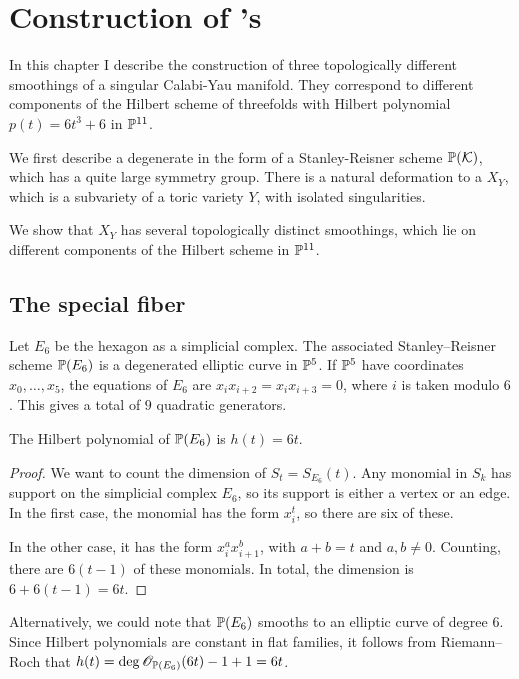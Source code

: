 \chapter{Construction of \CY's}
\label{sec:constructions}

In this chapter I describe the construction of three topologically different smoothings of a singular Calabi-Yau manifold. They correspond to different components of the Hilbert scheme of threefolds with Hilbert polynomial $p(t)=6t^3+6$ in $\P^{11}$. 

We first describe a degenerate \CY in the form of a Stanley-Reisner scheme $\P(\K)$, which has a quite large symmetry group. There is a natural deformation to a $X_Y$, which is a subvariety of a toric variety $Y$, with isolated singularities.

We show that $X_Y$ has several topologically distinct smoothings, which lie on different components of the Hilbert scheme in $\P^{11}$.

\section{The special fiber}

Let $E_6$ be the hexagon as a simplicial complex. The associated Stanley--Reisner scheme $\P(E_6)$ is a degenerated elliptic curve in $\P^5$. If $\P^5$ have coordinates $x_0,\ldots,x_5$, the equations of $E_6$ are $x_ix_{i+2}=x_ix_{i+3}=0$, where $i$ is taken modulo $6$. This gives a total of $9$ quadratic generators.

\begin{lemma}
The Hilbert polynomial of $\P(E_6)$ is $h(t)=6t$.
\end{lemma}
\begin{proof}
We want to count the dimension of $S_t=S_{E_6}(t)$. Any monomial in $S_k$ has support on the simplicial complex $E_6$, so its support is either a vertex or an edge. In the first case, the monomial has the form $x_i^t$, so there are six of these.

In the other case, it has the form $x_i^ax_{i+1}^b$, with $a+b=t$ and $a,b \neq 0$. Counting, there are $6(t-1)$ of these monomials. In total, the dimension is $6+6(t-1)=6t$.
\end{proof}
\begin{remark}
Alternatively, we could note that $\P(E_6)$ smooths to an elliptic curve of degree $6$. Since Hilbert polynomials are constant in flat families, it follows from Riemann--Roch that $h(t)=\deg \OO_{\P(E_6)}(6t)-1+1=6t$.
\end{remark}

